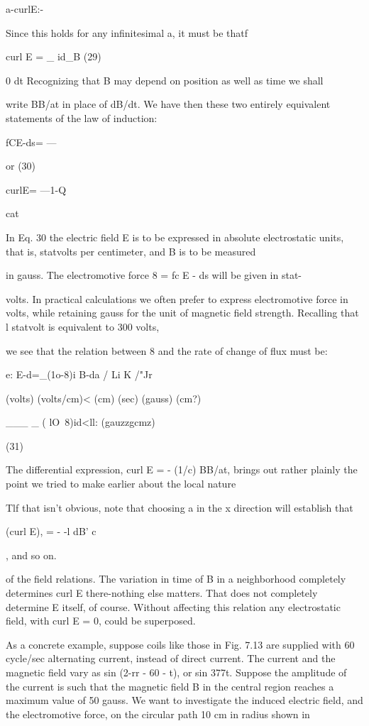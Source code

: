 a-curlE:-%

Since this holds for any infinitesimal a, it must be thatf

curl E = _ id_B (29)

0 dt
Recognizing that B may depend on position as well as time we shall

write BB/at in place of dB/dt. We have then these two entirely
equivalent statements of the law of induction:

fCE-ds= ---%

or (30)

curlE= ---1-Q

cat

In Eq. 30 the electric field E is to be expressed in absolute electrostatic
units, that is, statvolts per centimeter, and B is to be measured

in gauss. The electromotive force 8 = fc E - ds will be given in stat-

volts. In practical calculations we often prefer to express electromotive
force in volts, while retaining gauss for the unit of magnetic
field strength. Recalling that l statvolt is equivalent to 300 volts,

we see that the relation between 8 and the rate of change of flux
must be:

e: E-d=_(1o-8)i B-da
/ Li K /"Jr \

(volts) (volts/cm)< (cm) (sec) (gauss) (cm?)

___ _ ( lO~8)id<ll: (gauzzgcmz)

(31)

The differential expression, curl E = - (1/c) BB/at, brings out
rather plainly the point we tried to make earlier about the local nature

Tlf that isn't obvious, note that choosing a in the x direction will establish that

(curl E), = - -l dB'
c

, and so on.

of the field relations. The variation in time of B in a neighborhood
completely determines curl E there-nothing else matters. That
does not completely determine E itself, of course. Without affecting
this relation any electrostatic field, with curl E = 0, could be
superposed.

As a concrete example, suppose coils like those in Fig. 7.13 are
supplied with 60 cycle/sec alternating current, instead of direct
current. The current and the magnetic field vary as sin (2-rr - 60 - t),
or sin 377t. Suppose the amplitude of the current is such that the
magnetic field B in the central region reaches a maximum value of
50 gauss. We want to investigate the induced electric field, and the
electromotive force, on the circular path 10 cm in radius shown in

